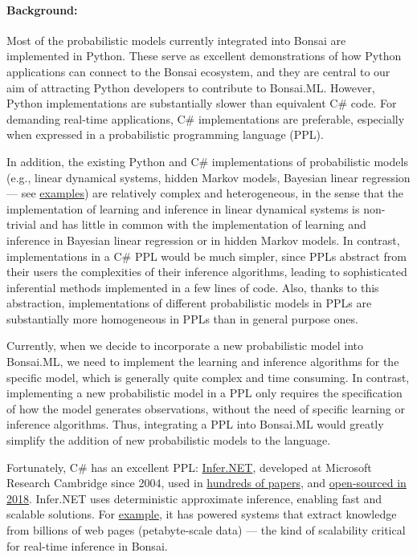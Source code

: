 \paragraph{Background:} Most of the probabilistic models currently integrated
into Bonsai are implemented in Python. These serve as excellent demonstrations
of how Python applications can connect to the Bonsai ecosystem, and they are
central to our aim of attracting Python developers to contribute to Bonsai.ML.
%
However, Python implementations are substantially slower than equivalent C\#
code. For demanding real-time applications, C\# implementations are preferable,
especially when expressed in a probabilistic programming language (PPL).

In addition, the existing Python and C\# implementations of probabilistic
models (e.g., linear dynamical systems, hidden Markov models, Bayesian linear
regression — see
\href{https://bonsai-rx.org/machinelearning/examples/README.html}{examples})
are relatively complex and heterogeneous, in the sense that the implementation
of learning and inference in linear dynamical systems is non-trivial and has
little in common with the implementation of learning and inference in Bayesian
linear regression or in hidden Markov models.
%
In contrast, implementations in a C\# PPL would be much simpler, since PPLs
abstract from their users the complexities of their inference algorithms,
leading to sophisticated inferential methods implemented in a few lines of
code.
%
Also, thanks to this abstraction, implementations of different probabilistic
models in PPLs are substantially more homogeneous in PPLs than in general
purpose ones.

Currently, when we decide to incorporate a new probabilistic model into
Bonsai.ML, we need to implement the learning and inference algorithms for the
specific model, which is generally quite complex and time consuming.
%
In contrast, implementing a new probabilistic model in a PPL only requires the
specification of how the model generates observations, without the
need of specific learning or inference algorithms.
%
Thus, integrating a PPL into Bonsai.ML would greatly simplify the addition of
new probabilistic models to the language.

Fortunately, C\# has an excellent PPL:
\href{https://dotnet.github.io/infer/}{Infer.NET}, developed at Microsoft
Research Cambridge since 2004, used in
\href{https://dotnet.github.io/infer/papers.html}{hundreds of papers}, and
\href{https://www.microsoft.com/en-us/research/blog/the-microsoft-infer-net-machine-learning-framework-goes-open-source/}{open-sourced
in 2018}.  Infer.NET uses deterministic approximate inference, enabling fast
and scalable solutions. For
\href{https://www.microsoft.com/en-us/research/blog/the-microsoft-infer-net-machine-learning-framework-goes-open-source/}{example},
it has powered systems that extract knowledge from billions of web pages
(petabyte-scale data) — the kind of scalability critical for real-time
inference in Bonsai.

